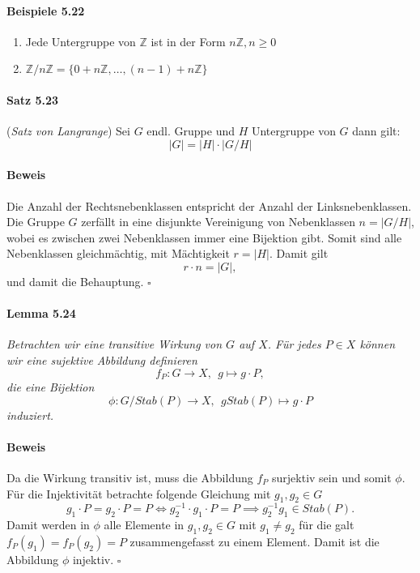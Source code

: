 \documentclass{scrartcl}
\begin{document}
\paragraph{Beispiele 5.22}
\begin{enumerate}
\item Jede Untergruppe von $\mathbb{Z}$ ist in der Form $n\mathbb{Z}, n \geq 0$
\item $\mathbb{Z}/n\mathbb{Z} = \{0 + n\mathbb{Z}, \dots, (n - 1) + n\mathbb{Z}\}$
\end{enumerate}

\paragraph{Satz 5.23} (\textit{Satz von Langrange}) Sei $G$ endl. Gruppe und $H$
Untergruppe von $G$ dann gilt:
\[
  |G| = |H| \cdot |G/H|
\]
\paragraph{Beweis}
Die Anzahl der Rechtsnebenklassen entspricht der Anzahl der Linksnebenklassen.
Die Gruppe $G$ zerfällt in eine disjunkte Vereinigung von Nebenklassen
$n=|G/H|$, wobei es zwischen zwei Nebenklassen immer eine Bijektion gibt. Somit
sind alle Nebenklassen gleichmächtig, mit Mächtigkeit $r=|H|$. Damit gilt
\[
  r \cdot n = |G|,
\]
und damit die Behauptung.
\hfill $\square$

\paragraph{Lemma 5.24} \textit{Betrachten wir eine transitive Wirkung von $G$
  auf $X$. Für jedes $P \in X$ können wir eine sujektive Abbildung definieren}
\[
  f_P: G \to X,~~g \mapsto g \cdot P,
\]
\textit{die eine Bijektion}
\[
  \phi: G/Stab(P) \to X,~~gStab(P) \mapsto g \cdot P
\]
\textit{induziert.}
\paragraph{Beweis}
Da die Wirkung transitiv ist, muss die Abbildung $f_P$ surjektiv sein und somit
$\phi$. Für die Injektivität betrachte folgende Gleichung mit $g_1,g_2 \in G$
\[
  g_1 \cdot P = g_2 \cdot P = P \iff g_2^{-1} \cdot g_1 \cdot P = P \implies
  g_2^{-1}g_1 \in Stab(P).
\]
Damit werden in $\phi$ alle Elemente in $g_1, g_2 \in G$ mit $g_1 \neq g_2$ für
die galt $f_P(g_1)=f_P(g_2)=P$ zusammengefasst zu einem Element. Damit ist die
Abbildung $\phi$ injektiv.
\hfill $\square$
\end{document}
